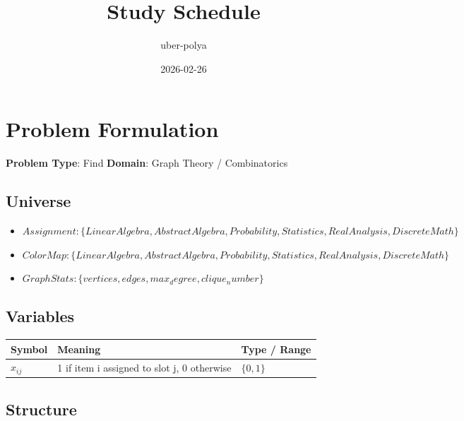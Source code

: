 \documentclass[11pt, a4paper]{article}
\title{Study Schedule}
\author{uber-polya}
\date{2026-02-26}
\begin{document}
\maketitle
\tableofcontents
\newpage

\section{Problem Formulation}

\begin{polyamodel}

\textbf{Problem Type}: Find \hfill
\textbf{Domain}: Graph Theory / Combinatorics


\end{polyamodel}

\subsection{Universe}

\begin{itemize}
  \item $Assignment: \{Linear Algebra, Abstract Algebra, Probability, Statistics, Real Analysis, Discrete Math\}$
  \item $Color Map: \{Linear Algebra, Abstract Algebra, Probability, Statistics, Real Analysis, Discrete Math\}$
  \item $Graph Stats: \{vertices, edges, max_degree, clique_number\}$
\end{itemize}

\subsection{Variables}

\begin{longtable}{lll}
\toprule
\textbf{Symbol} & \textbf{Meaning} & \textbf{Type / Range} \\
\midrule
\endhead
$x_{ij}$ & 1 if item i assigned to slot j, 0 otherwise & $\{0, 1\}$ \\
\bottomrule
\end{longtable}

\subsection{Structure}
\end{document}
